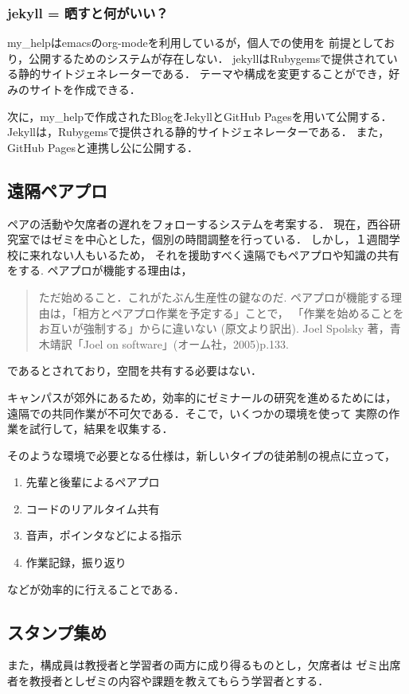 \documentclass[a4,p11]{article}
\begin{document}
\subsubsection{jekyll = 晒すと何がいい？}
\label{sec:orgaf96f08}
my\_helpはemacsのorg-modeを利用しているが，個人での使用を
前提としており，公開するためのシステムが存在しない．
jekyllはRubygemsで提供されている静的サイトジェネレーターである．
テーマや構成を変更することができ，好みのサイトを作成できる．

次に，my\_helpで作成されたBlogをJekyllとGitHub Pagesを用いて公開する．
Jekyllは，Rubygemsで提供される静的サイトジェネレーターである．
また，GitHub Pagesと連携し公に公開する．

\subsection{遠隔ペアプロ}
\label{sec:org5ef62ba}
ペアの活動や欠席者の遅れをフォローするシステムを考案する．
現在，西谷研究室ではゼミを中心とした，個別の時間調整を行っている．
しかし，１週間学校に来れない人もいるため，
それを援助すべく遠隔でもペアプロや知識の共有をする.
ペアプロが機能する理由は，
\begin{quote}
ただ始めること．これがたぶん生産性の鍵なのだ.
ペアプロが機能する理由は，「相方とペアプロ作業を予定する」ことで，
「作業を始めることをお互いが強制する」からに違いない
(原文より訳出).
Joel Spolsky 著，青木靖訳「Joel on software」(オーム社，2005)p.133.
\end{quote}
であるとされており，空間を共有する必要はない．

キャンパスが郊外にあるため，効率的にゼミナールの研究を進めるためには，
遠隔での共同作業が不可欠である．そこで，いくつかの環境を使って
実際の作業を試行して，結果を収集する．

そのような環境で必要となる仕様は，新しいタイプの徒弟制の視点に立って，
\begin{enumerate}
\item 先輩と後輩によるペアプロ
\item コードのリアルタイム共有
\item 音声，ポインタなどによる指示
\item 作業記録，振り返り
\end{enumerate}
などが効率的に行えることである．

\subsection{スタンプ集め}
\label{sec:org073ac61}
また，構成員は教授者と学習者の両方に成り得るものとし，欠席者は
ゼミ出席者を教授者としゼミの内容や課題を教えてもらう学習者とする．
\end{document}
